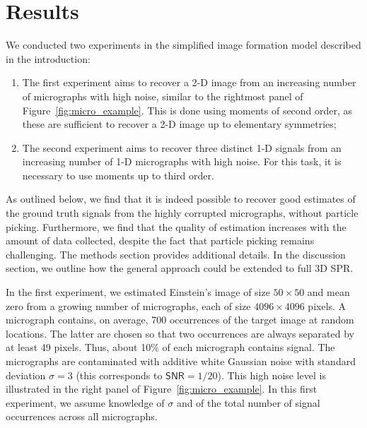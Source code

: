 \documentclass[english,11pt]{article}
\newcommand{\1}{\mathbf{1}}
\newcommand{\TODO}[1]{{\color{red}{[#1]}}}
\numberwithin{equation}{section}
\theoremstyle{plain}
\theoremstyle{definition}
\theoremstyle{remark}
\theoremstyle{plain}
\theoremstyle{remark}
\theoremstyle{plain}
\theoremstyle{plain}
\newcommand{\SNR}{\ensuremath{\textsf{SNR}}}
\begin{document}
\section{Results} \label{sec:results}


We conducted two experiments in the simplified image formation model described in the introduction:
\begin{enumerate}
	\item The first experiment aims to recover a 2-D image from an increasing number of micrographs with high noise, similar to the rightmost panel of Figure~\ref{fig:micro_example}. This is done using moments of second order, as these are sufficient to recover a 2-D image up to elementary symmetries;
	\item The second experiment aims to recover three distinct 1-D signals from an increasing number of 1-D micrographs with high noise. For this task, it is necessary to use moments up to third order.
\end{enumerate}
As outlined below, we find that it is indeed possible to recover good estimates of the ground truth signals from the highly corrupted micrographs, without particle picking. Furthermore, we find that the quality of estimation increases with the amount of data collected, despite the fact that particle picking remains challenging. The methods section provides additional details. In the discussion section, we outline how the general approach could be extended to full 3D SPR.



In the first experiment, we estimated Einstein's image of size $50\times 50$ and mean zero from a growing number of micrographs, each of size $4096\times 4096$ pixels. A micrograph contains, on average, 700 occurrences of the target image at random locations. The latter are chosen so that two occurrences are always separated by at least 49 pixels. Thus, about 10\% of each micrograph contains signal. The micrographs are contaminated with additive white Gaussian noise with standard deviation $\sigma=3$ (this corresponds to $\SNR=1/20$). This high noise level is illustrated in the right panel of Figure~\ref{fig:micro_example}. In this first experiment, we assume knowledge of $\sigma$ and of the total number of signal occurrences across all micrographs.
\end{document}
